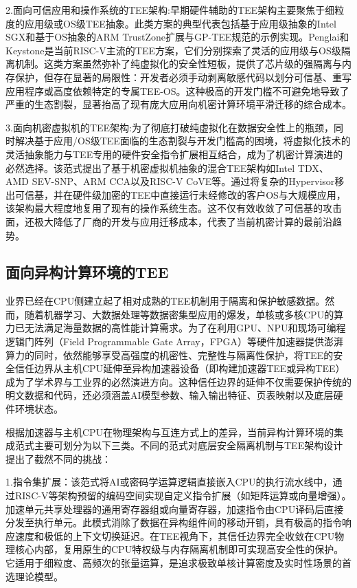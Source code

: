 \documentclass[master, vlined, review]{DissertUESTC}
\begin{document}
	2.面向可信应用和操作系统的TEE架构:早期硬件辅助的TEE架构主要聚焦于细粒度的应用级或OS级TEE抽象。此类方案的典型代表包括基于应用级抽象的Intel SGX和基于OS抽象的ARM TrustZone扩展与GP-TEE规范的示例实现。Penglai和Keystone是当前RISC-V主流的TEE方案，它们分别探索了灵活的应用级与OS级隔离机制。这类方案虽然弥补了纯虚拟化的安全性短板，提供了芯片级的强隔离与内存保护，但存在显著的局限性：开发者必须手动剥离敏感代码以划分可信基、重写应用程序或高度依赖特定的专属TEE-OS。这种极高的开发门槛不可避免地导致了严重的生态割裂，显著抬高了现有庞大应用向机密计算环境平滑迁移的综合成本。
	
	3.面向机密虚拟机的TEE架构:为了彻底打破纯虚拟化在数据安全性上的瓶颈，同时解决基于应用/OS级TEE面临的生态割裂与开发门槛高的困境，将虚拟化技术的灵活抽象能力与TEE专用的硬件安全指令扩展相互结合，成为了机密计算演进的必然选择。该范式提出了基于机密虚拟机抽象的混合TEE架构如Intel TDX、AMD SEV-SNP、ARM CCA以及RISC-V CoVE等。通过将复杂的Hypervisor移出可信基，并在硬件级加密的TEE中直接运行未经修改的客户OS与大规模应用，该架构最大程度地复用了现有的操作系统生态。这不仅有效收敛了可信基的攻击面，还极大降低了厂商的开发与应用迁移成本，代表了当前机密计算的最前沿趋势。
	
	\subsection{面向异构计算环境的TEE}
	业界已经在CPU侧建立起了相对成熟的TEE机制用于隔离和保护敏感数据。然而，随着机器学习、大数据处理等数据密集型应用的爆发，单核或多核CPU的算力已无法满足海量数据的高性能计算需求。为了在利用GPU、NPU和现场可编程逻辑门阵列（Field Programmable Gate Array，FPGA）等硬件加速器提供澎湃算力的同时，依然能够享受高强度的机密性、完整性与隔离性保护，将TEE的安全信任边界从主机CPU延伸至异构加速器设备（即构建加速器TEE或异构TEE）成为了学术界与工业界的必然演进方向。这种信任边界的延伸不仅需要保护传统的明文数据和代码，还必须涵盖AI模型参数、输入输出特征、页表映射以及底层硬件环境状态。
	
	根据加速器与主机CPU在物理架构与互连方式上的差异，当前异构计算环境的集成范式主要可划分为以下三类。不同的范式对底层安全隔离机制与TEE架构设计提出了截然不同的挑战：

	1.指令集扩展：该范式将AI或密码学运算逻辑直接嵌入CPU的执行流水线中，通过RISC-V等架构预留的编码空间实现自定义指令扩展（如矩阵运算或向量增强）。加速单元共享处理器的通用寄存器组或向量寄存器，加速指令由CPU译码后直接分发至执行单元。此模式消除了数据在异构组件间的移动开销，具有极高的指令响应速度和极低的上下文切换延迟。在TEE视角下，其信任边界完全收敛在CPU物理核心内部，复用原生的CPU特权级与内存隔离机制即可实现高安全性的保护。它适用于细粒度、高频次的张量运算，是追求极致单核计算密度及实时性场景的首选理论模型。
		
\end{document}
